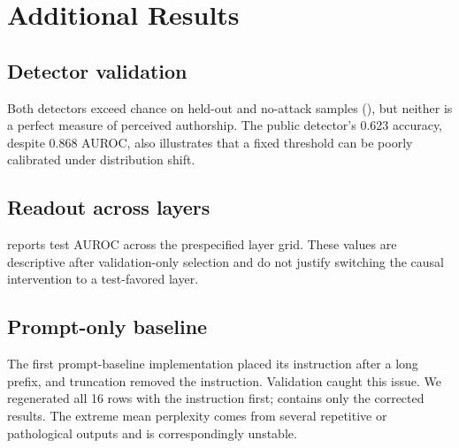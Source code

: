 \section{Additional Results}
\label{app:additional}

\subsection{Detector validation}



Both detectors exceed chance on held-out \mage and no-attack \raid samples (), but neither is a perfect measure of perceived authorship. The public detector's 0.623 \raid accuracy, despite 0.868 AUROC, also illustrates that a fixed threshold can be poorly calibrated under distribution shift.

\subsection{Readout across layers}



 reports test AUROC across the prespecified layer grid. These values are descriptive after validation-only selection and do not justify switching the causal intervention to a test-favored layer.

\subsection{Prompt-only baseline}



The first prompt-baseline implementation placed its instruction after a long prefix, and truncation removed the instruction. Validation caught this issue. We regenerated all 16 rows with the instruction first;  contains only the corrected results. The extreme mean perplexity comes from several repetitive or pathological outputs and is correspondingly unstable.

